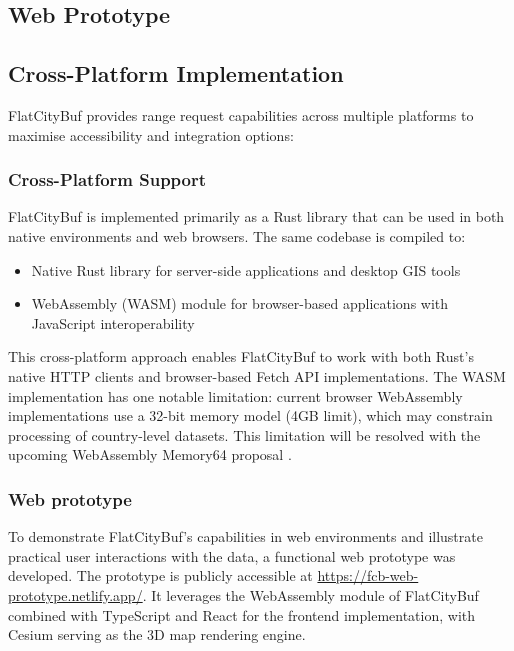 \subsection{Web Prototype}
\label{result:web_prototype}

\subsection{Cross-Platform Implementation}
\label{result:cross_platform_implementation}

FlatCityBuf provides range request capabilities across multiple platforms to maximise accessibility and integration options:
\subsubsection{Cross-Platform Support}
\label{result:cross_platform_implementation:cross_platform}

FlatCityBuf is implemented primarily as a Rust library that can be used in both native environments and web browsers. The same codebase is compiled to:

\begin{itemize}
  \item Native Rust library for server-side applications and desktop GIS tools
  \item WebAssembly (WASM) module for browser-based applications with JavaScript interoperability
\end{itemize}

This cross-platform approach enables FlatCityBuf to work with both Rust's native HTTP clients and browser-based Fetch API implementations. The WASM implementation has one notable limitation: current browser WebAssembly implementations use a 32-bit memory model (4GB limit), which may constrain processing of country-level datasets. This limitation will be resolved with the upcoming WebAssembly Memory64 proposal \citep{WebAssemblyCoreSpecification2}.
\subsubsection{Web prototype}
\label{result:cross_platform_implementation:web_prototype}

To demonstrate FlatCityBuf's capabilities in web environments and illustrate practical user interactions with the data, a functional web prototype was developed. The prototype is publicly accessible at \url{https://fcb-web-prototype.netlify.app/}. It leverages the WebAssembly module of FlatCityBuf combined with TypeScript and React for the frontend implementation, with Cesium serving as the 3D map rendering engine.

